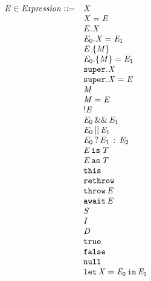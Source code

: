 \documentclass{article}
\begin{document}
\newcommand{\ThisExpression}{\tt{this}}
\newcommand{\Rethrow}{\tt{rethrow}}
\newcommand{\Throw}[1]{\tt{throw}\,#1}


\newcommand{\AwaitExpression}[1]{\tt{await\,#1}}


\newcommand{\StringLiteral}[1]{#1}
\newcommand{\IntLiteral}[1]{#1}
\newcommand{\DoubleLiteral}[1]{#1}
\newcommand{\BoolLiteral}[1]{#1}
\newcommand{\NullLiteral}{\tt{null}}
\newcommand{\Let}[3]{\tt{let}\,#1=#2\,\tt{in}\,#3}


\[
\begin{array}{rl}
  \expressionmeta \in \mathit{Expression} ::=
  & \VariableGet{\variablemeta} \\
  & \VariableSet{\variablemeta}{\expressionmeta} \\
  & \PropertyGet{\expressionmeta}{\idmeta} \\
  & \PropertySet{\expressionmeta_0}{\idmeta}{\expressionmeta_1} \\
  & \DirectPropertyGet{\expressionmeta}{\membermeta} \\
  & \DirectPropertySet{\expressionmeta_0}{\membermeta}{\expressionmeta_1} \\
  & \SuperPropertyGet{\idmeta} \\
  & \SuperPropertySet{\idmeta}{\expressionmeta} \\
  & \StaticGet{\membermeta} \\
  & \StaticSet{\membermeta}{\expressionmeta} \\
  & \Not{\expressionmeta} \\
  & \AndExpression{\expressionmeta_0}{\expressionmeta_1} \\
  & \OrExpression{\expressionmeta_0}{\expressionmeta_1} \\
  & \ConditionalExpression{\expressionmeta_0}{\expressionmeta_1}{\expressionmeta_2} \\
  & \IsExpression{\expressionmeta}{\typemeta} \\
  & \AsExpression{\expressionmeta}{\typemeta} \\
  & \ThisExpression \\
  & \Rethrow \\
  & \Throw{\expressionmeta} \\
  & \AwaitExpression{\expressionmeta} \\
  & \StringLiteral{\stringmeta} \\
  & \IntLiteral{\integermeta} \\
  & \DoubleLiteral{\doublemeta} \\
  & \BoolLiteral{\tt{true}} \\
  & \BoolLiteral{\tt{false}} \\
  & \NullLiteral \\
  & \Let{\variablemeta}{\expressionmeta_0}{\expressionmeta_1} \\
\end{array}  
\]
\end{document}
